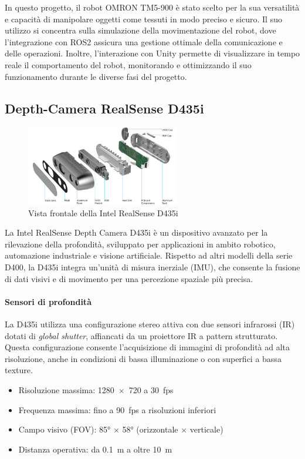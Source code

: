 \documentclass[11pt]{report}
\begin{document}
In questo progetto, il robot OMRON TM5-900 è stato scelto per la sua versatilità e capacità di manipolare oggetti come tessuti in modo preciso e sicuro. Il suo utilizzo si concentra sulla simulazione della movimentazione del robot, dove l'integrazione con ROS2 assicura una gestione ottimale della comunicazione e delle operazioni. Inoltre, l'interazione con Unity permette di visualizzare in tempo reale il comportamento del robot, monitorando e ottimizzando il suo funzionamento durante le diverse fasi del progetto.


\subsection{Depth-Camera RealSense D435i}

\begin{figure}[H]
    \centering
    \includegraphics[width=0.6\textwidth]{images/d435i}
    \caption{Vista frontale della Intel RealSense D435i}
    \label{fig:d435i}
\end{figure}

La Intel RealSense Depth Camera D435i è un dispositivo avanzato per la rilevazione della profondità, sviluppato per applicazioni in ambito robotico, automazione industriale e visione artificiale. Rispetto ad altri modelli della serie D400, la D435i integra un’unità di misura inerziale (IMU), che consente la fusione di dati visivi e di movimento per una percezione spaziale più precisa.

\paragraph{Sensori di profondità}  
La D435i utilizza una configurazione stereo attiva con due sensori infrarossi (IR) dotati di \emph{global shutter}, affiancati da un proiettore IR a pattern strutturato. Questa configurazione consente l’acquisizione di immagini di profondità ad alta risoluzione, anche in condizioni di bassa illuminazione o con superfici a bassa texture.

\begin{itemize}
  \item Risoluzione massima: 1280~$\times$~720 a 30~fps
  \item Frequenza massima: fino a 90~fps a risoluzioni inferiori
  \item Campo visivo (FOV): 85° $\times$ 58° (orizzontale $\times$ verticale)
  \item Distanza operativa: da 0.1~m a oltre 10~m
\end{itemize}
\end{document}
